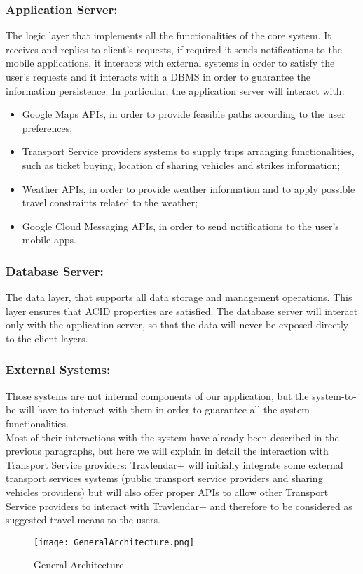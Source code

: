 \subsubsection{Application Server:}
\label{subsubsect:Application Server}
The logic layer that implements all the functionalities of the core system. It receives and replies to client's requests, if required it sends notifications to the mobile applications, it interacts with external systems in order to satisfy the user's requests and it interacts with a DBMS in order to guarantee the information persistence.
In particular, the application server will interact with:
\begin{itemize}
\item Google Maps APIs, in order to provide feasible paths according to the user preferences;
\item Transport Service providers systems to supply trips arranging functionalities, such as ticket buying, location of sharing vehicles and strikes information;
\item Weather APIs, in order to provide weather information and to apply possible travel constraints related to the weather;
\item Google Cloud Messaging APIs, in order to send notifications to the user's mobile apps.
\end{itemize} 
\subsubsection{Database Server:}
\label{subsubsect:Database Server}
The data layer, that supports all data storage and management operations. This layer ensures that ACID properties are satisfied. The database server will interact only with the application server, so that the data will never be exposed directly to the client layers.
\subsubsection{External Systems:}
\label{subsubsect:External Systems}
Those systems are not internal components of our application, but the system-to-be will have to interact with them in order to guarantee all the system functionalities. \\
Most of their interactions with the system have already been described in the previous paragraphs, but here we will explain in detail the interaction with Transport Service providers: Travlendar+ will initially integrate some external transport services systems (public transport service providers and sharing vehicles providers) but will also offer proper APIs to allow other Transport Service providers to interact with Travlendar+ and therefore to be considered as suggested travel means to the users.


\begin{figure}[H]
\begin{center}
		\hspace*{-50pt}
		\texttt{[image: GeneralArchitecture.png]}
\end{center}
\caption{General Architecture}
\end{figure}
